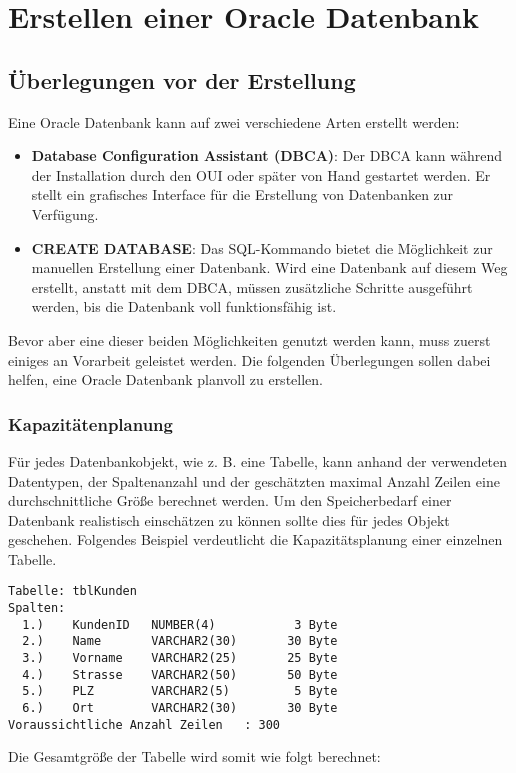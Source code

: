 \chapter{Erstellen einer Oracle Datenbank}
  \chaptertoc{}
  \cleardoubleevenpage
  
      \section{Überlegungen vor der Erstellung}
      Eine Oracle Datenbank kann auf zwei verschiedene Arten erstellt werden:
      \begin{itemize}
        \item \textbf{Database Configuration Assistant (DBCA)}: Der DBCA kann während der Installation durch den OUI oder später von Hand gestartet werden. Er stellt ein grafisches Interface für die Erstellung von Datenbanken zur Verfügung.
        \item \textbf{CREATE DATABASE}: Das SQL-Kommando  bietet die Möglichkeit zur manuellen Erstellung einer Datenbank. Wird eine Datenbank auf diesem Weg erstellt, anstatt mit dem DBCA, müssen zusätzliche Schritte ausgeführt werden, bis die Datenbank voll funktionsfähig ist.
      \end{itemize}
      Bevor aber eine dieser beiden Möglichkeiten genutzt werden kann, muss zuerst einiges an Vorarbeit geleistet werden. Die folgenden Überlegungen sollen dabei helfen, eine Oracle Datenbank planvoll zu erstellen.
      \subsection{Kapazitätenplanung}
        Für jedes Datenbankobjekt, wie z. B. eine Tabelle, kann anhand der verwendeten Datentypen, der Spaltenanzahl und der geschätzten maximal Anzahl Zeilen eine durchschnittliche Größe berechnet werden. Um den Speicherbedarf einer Datenbank realistisch einschätzen zu können sollte dies für jedes Objekt geschehen. Folgendes Beispiel verdeutlicht die Kapazitätsplanung einer einzelnen Tabelle.
          \begin{verbatim}
Tabelle: tblKunden
Spalten:
  1.)    KundenID   NUMBER(4)           3 Byte
  2.)    Name       VARCHAR2(30)       30 Byte
  3.)    Vorname    VARCHAR2(25)       25 Byte
  4.)    Strasse    VARCHAR2(50)       50 Byte
  5.)    PLZ        VARCHAR2(5)         5 Byte
  6.)    Ort        VARCHAR2(30)       30 Byte
Voraussichtliche Anzahl Zeilen   : 300
          \end{verbatim}
          Die Gesamtgröße der Tabelle  wird somit wie folgt berechnet:

